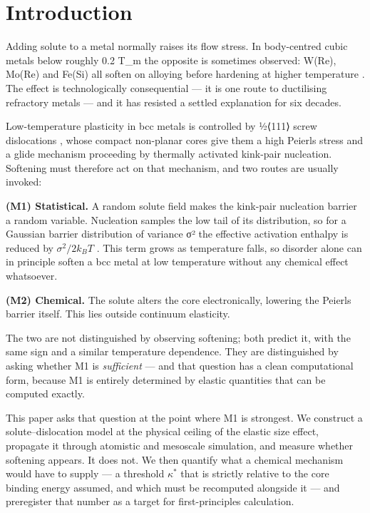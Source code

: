 \documentclass[11pt,a4paper]{article}
\begin{document}
\hypertarget{introduction}{%
\section{Introduction}\label{sec:introduction}}

Adding solute to a metal normally raises its flow stress. In body-centred cubic metals below roughly 0.2 T\_m the opposite is sometimes observed: W(Re), Mo(Re) and Fe(Si) all soften on alloying before hardening at higher temperature \cite{christian1983}. The effect is technologically consequential --- it is one route to ductilising refractory metals --- and it has resisted a settled explanation for six decades.

Low-temperature plasticity in bcc metals is controlled by ½⟨111⟩ screw dislocations \cite{hirth1982,dezerald2014}, whose compact non-planar cores give them a high Peierls stress and a glide mechanism proceeding by thermally activated kink-pair nucleation. Softening must therefore act on that mechanism, and two routes are usually invoked:

\textbf{(M1) Statistical.} A random solute field makes the kink-pair nucleation barrier a random variable. Nucleation samples the low tail of its distribution, so for a Gaussian barrier distribution of variance σ² the effective activation enthalpy is reduced by \(\sigma^2/2k_BT\) \cite{labusch1970,kocks1975}. This term grows as temperature falls, so disorder alone can in principle soften a bcc metal at low temperature without any chemical effect whatsoever.

\textbf{(M2) Chemical.} The solute alters the core electronically, lowering the Peierls barrier itself. This lies outside continuum elasticity.

The two are not distinguished by observing softening; both predict it, with the same sign and a similar temperature dependence. They are distinguished by asking whether M1 is \emph{sufficient} --- and that question has a clean computational form, because M1 is entirely determined by elastic quantities that can be computed exactly.

This paper asks that question at the point where M1 is strongest. We construct a solute--dislocation model at the physical ceiling of the elastic size effect, propagate it through atomistic and mesoscale simulation, and measure whether softening appears. It does not. We then quantify what a chemical mechanism would have to supply --- a threshold \(\kappa^*\) that is strictly relative to the core binding energy assumed, and which must be recomputed alongside it --- and preregister that number as a target for first-principles calculation.
\end{document}
